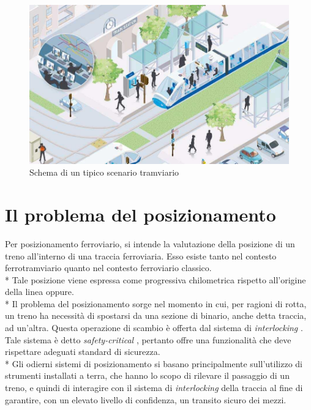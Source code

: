 \begin{figure}[h]
		\centering
		\includegraphics[width=0.7\linewidth]{img/twschema}
		\caption{Schema di un tipico scenario tramviario}
		\label{fig:tramschema}
\end{figure}
\section{Il problema del posizionamento}
Per posizionamento ferroviario, si intende la valutazione della posizione di un treno all'interno di una traccia ferroviaria. Esso esiste tanto nel contesto ferrotramviario quanto nel contesto ferroviario classico.\\*
Tale posizione viene espressa come progressiva chilometrica rispetto all'origine della linea oppure.\\*
Il problema del posizionamento sorge nel momento in cui, per ragioni di rotta, un treno ha necessit\`a di spostarsi da una sezione di binario, anche detta traccia, ad un'altra. Questa operazione di scambio \`e offerta dal sistema di \emph{interlocking} \cite{interlocking}. Tale sistema \`e detto \emph{safety-critical} \cite{safetycritical}, pertanto offre una funzionalit\`a che deve rispettare adeguati standard di sicurezza.\\*
Gli odierni sistemi di posizionamento si basano principalmente sull'utilizzo di strumenti installati a terra, che hanno lo scopo di rilevare il passaggio di un treno, e quindi di interagire con il sistema di \emph{interlocking} della traccia al fine di garantire, con un elevato livello di confidenza, un transito sicuro dei mezzi.
